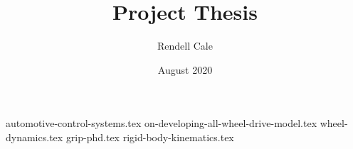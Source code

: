 \documentclass{article}
\title{Project Thesis}
\author{Rendell Cale}
\date{August 2020}
\begin{document}
\maketitle

{automotive-control-systems.tex}
{on-developing-all-wheel-drive-model.tex}
{wheel-dynamics.tex}
{grip-phd.tex}
{rigid-body-kinematics.tex}

\printbibliography
\end{document}
